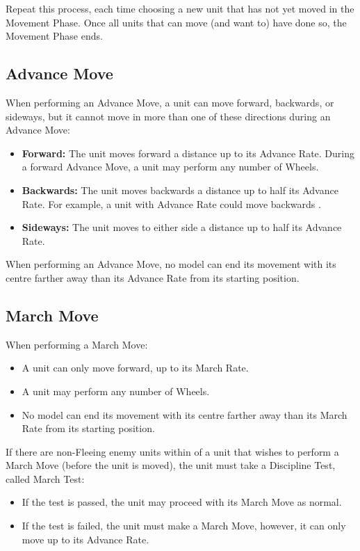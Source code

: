 Repeat this process, each time choosing a new unit that has not yet moved in the Movement Phase. Once all units that can move (and want to) have done so, the Movement Phase ends.

\subsection{Advance Move}
\label{advance_move}

When performing an Advance Move, a unit can move forward, backwards, or sideways, but it cannot move in more than one of these directions during an Advance Move:

\begin{itemize}[label={-}]
\item\textbf{Forward:} The unit moves forward a distance up to its Advance Rate. During a forward Advance Move, a unit may perform any number of Wheels.
\item\textbf{Backwards:} The unit moves backwards a distance up to half its Advance Rate. For example, a unit with Advance Rate  could move backwards .
\item\textbf{Sideways:} The unit moves to either side a distance up to half its Advance Rate.
\end{itemize}

When performing an Advance Move, no model can end its movement with its centre farther away than its Advance Rate from its starting position.

\subsection{March Move}
\label{march_move}

When performing a March Move:

\begin{itemize}[label={-}]
\item A unit can only move forward, up to its March Rate.
\item A unit may perform any number of Wheels.
\item No model can end its movement with its centre farther away than its March Rate from its starting position.
\end{itemize}

If there are non-Fleeing enemy units within  of a unit that wishes to perform a March Move (before the unit is moved), the unit must take a Discipline Test, called March Test:
\begin{itemize}[label={-}]
\item If the test is passed, the unit may proceed with its March Move as normal.
\item If the test is failed, the unit must make a March Move, however, it can only move up to its Advance Rate.
\end{itemize}

